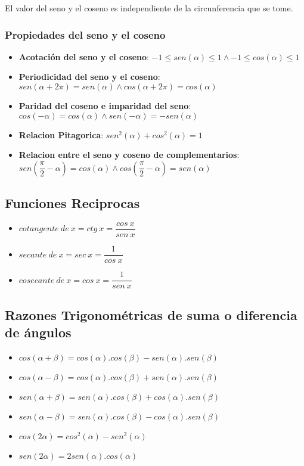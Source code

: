\documentclass[10pt]{article}
\begin{document}
El valor del seno y el coseno es independiente de la circunferencia que se tome.
\subsubsection{Propiedades del seno y el coseno}
\begin{itemize}
\item \textbf{Acotación del seno y el coseno}: $-1 \leq sen(\alpha) \leq 1 \land -1 \leq cos(\alpha) \leq 1$
\item \textbf{Periodicidad del seno y el coseno}: $sen(\alpha + 2\pi) = sen(\alpha) \land cos(\alpha + 2\pi) = cos(\alpha)$
\item \textbf{Paridad del coseno e imparidad del seno}: $cos(-\alpha) = cos(\alpha) \land sen(-\alpha) = -sen(\alpha)$
\item \textbf{Relacion Pitagorica}: $sen^2(\alpha)+cos^2(\alpha) = 1$
\item \textbf{Relacion entre el seno y coseno de complementarios}: $sen \left(\dfrac{\pi}{2} - \alpha \right) = cos(\alpha) \land cos\left(\dfrac{\pi}{2}-\alpha \right) = sen(\alpha)$
\end{itemize}
\subsection{Funciones Reciprocas}
\begin{itemize}
\item $cotangente\ de\ x = ctg\ x = \dfrac{cos\ x}{sen\ x}$
\item $secante\ de\ x = sec\ x = \dfrac{1}{cos\ x}$
\item $cosecante\ de\ x = cos\ x = \dfrac{1}{sen\ x}$
\end{itemize}

\subsection{Razones Trigonométricas de suma o diferencia de ángulos}
\begin{itemize}
\item $cos\left(\alpha + \beta \right) = cos(\alpha).cos(\beta)-sen(\alpha).sen(\beta)$
\item $cos\left(\alpha - \beta \right) = cos(\alpha).cos(\beta)+sen(\alpha).sen(\beta)$
\item $sen\left(\alpha + \beta \right) = sen(\alpha).cos(\beta)+cos(\alpha).sen(\beta)$
\item $sen\left(\alpha - \beta \right) = sen(\alpha).cos(\beta)-cos(\alpha).sen(\beta)$
\item $cos(2\alpha) = cos^2(\alpha)-sen^2(\alpha)$
\item $sen(2\alpha) = 2sen(\alpha).cos(\alpha)$
\end{itemize}
\end{document}

